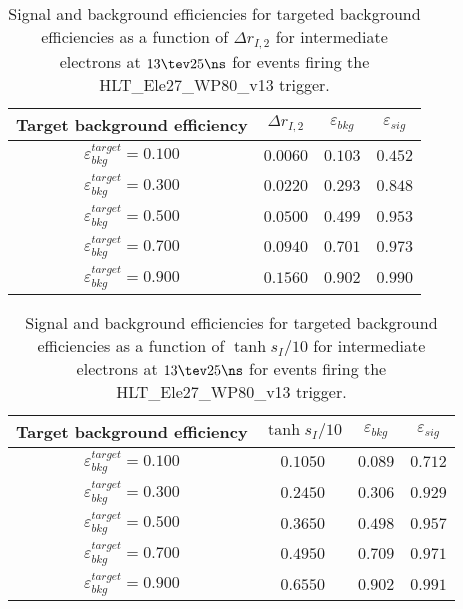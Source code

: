\clearpage

\begin{table}[!bht]
  \begin{center}
    \begin{tabular}{cccc}
      \hline
      Target background efficiency & $\Delta r_{I,2}$ & $\varepsilon_{bkg}$ & $\varepsilon_{sig}$ \\ 
      \hline
      $\varepsilon_{bkg}^{target} = 0.100$ & $  0.0060$ & $0.103$ & $0.452$ \\
      $\varepsilon_{bkg}^{target} = 0.300$ & $  0.0220$ & $0.293$ & $0.848$ \\
      $\varepsilon_{bkg}^{target} = 0.500$ & $  0.0500$ & $0.499$ & $0.953$ \\
      $\varepsilon_{bkg}^{target} = 0.700$ & $  0.0940$ & $0.701$ & $0.973$ \\
      $\varepsilon_{bkg}^{target} = 0.900$ & $  0.1560$ & $0.902$ & $0.990$ \\
      \hline
    \end{tabular}
    \caption{Signal and background efficiencies for targeted background efficiencies as a function of $\Delta r_{I,2}$ for intermediate electrons at $13\tev 25\ns$ for events firing the HLT\_Ele27\_WP80\_v13 trigger.}
    \label{tab:eff_rej_r2I_beam_13_25_trigger_27_I}
  \end{center}
\end{table}

\clearpage

\begin{table}[!bht]
  \begin{center}
    \begin{tabular}{cccc}
      \hline
      Target background efficiency & $\tanh{s_I/10}$ & $\varepsilon_{bkg}$ & $\varepsilon_{sig}$ \\ 
      \hline
      $\varepsilon_{bkg}^{target} = 0.100$ & $  0.1050$ & $0.089$ & $0.712$ \\
      $\varepsilon_{bkg}^{target} = 0.300$ & $  0.2450$ & $0.306$ & $0.929$ \\
      $\varepsilon_{bkg}^{target} = 0.500$ & $  0.3650$ & $0.498$ & $0.957$ \\
      $\varepsilon_{bkg}^{target} = 0.700$ & $  0.4950$ & $0.709$ & $0.971$ \\
      $\varepsilon_{bkg}^{target} = 0.900$ & $  0.6550$ & $0.902$ & $0.991$ \\
      \hline
    \end{tabular}
    \caption{Signal and background efficiencies for targeted background efficiencies as a function of $\tanh{s_I/10}$ for intermediate electrons at $13\tev 25\ns$ for events firing the HLT\_Ele27\_WP80\_v13 trigger.}
    \label{tab:eff_rej_sI_beam_13_25_trigger_27_I}
  \end{center}
\end{table}

